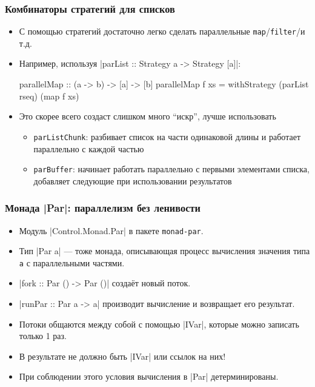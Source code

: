 \documentclass[11pt]{beamer}
\begin{document}
\begin{frame}[fragile]
\frametitle{Комбинаторы стратегий для списков}
\begin{itemize}
    \item С помощью стратегий достаточно легко сделать параллельные \lstinline|map|/\lstinline|filter|/и т.д.
    \item Например, используя \haskinline|parList :: Strategy a -> Strategy [a]|:
\begin{haskell}
parallelMap :: (a -> b) -> [a] -> [b]
parallelMap f xs = 
  withStrategy (parList rseq) (map f xs)
\end{haskell}
    \pause
    \item Это скорее всего создаст слишком много \enquote{искр}, лучше использовать
    \begin{itemize}
        \item \lstinline|parListChunk|: разбивает список на части одинаковой длины и работает параллельно с каждой частью
        \item \lstinline|parBuffer|: начинает работать параллельно с первыми элементами списка, добавляет следующие при использовании результатов
    \end{itemize}
\end{itemize}
\end{frame}

\begin{frame}[fragile]
\frametitle{Монада \haskinline|Par|: параллелизм без ленивости}
\begin{itemize}
    \item Модуль \haskinline|Control.Monad.Par| в пакете \lstinline|monad-par|.
    \item Тип \haskinline|Par a| --- тоже монада, описывающая процесс вычисления значения типа \lstinline|a| с параллельными частями.
    \item \haskinline|fork :: Par () -> Par ()| создаёт новый поток.
    \item \haskinline|runPar :: Par a -> a| производит вычисление и возвращает его результат. \pause
    \item Потоки общаются между собой с помощью \haskinline|IVar|, которые можно записать только 1 раз.
    \item В результате не должно быть \haskinline|IVar| или ссылок на них! 
    \item При соблюдении этого условия вычисления в \haskinline|Par| детерминированы.
\end{itemize}
\end{frame}
\end{document}
